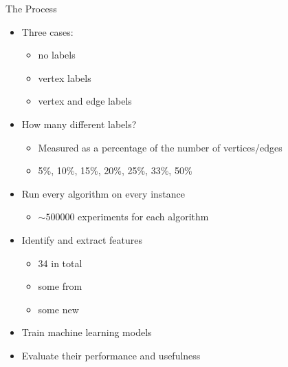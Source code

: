 \documentclass{beamer}
\begin{document}
\begin{frame}{The Process}
  \begin{itemize}
  \item Three cases:
    \begin{itemize}
    \item no labels
    \item vertex labels
    \item vertex and edge labels
    \end{itemize}
    \pause
  \item How many different labels?
    \begin{itemize}
    \item Measured as a percentage of the number of vertices/edges
    \item 5\%, 10\%, 15\%, 20\%, 25\%, 33\%, 50\%
    \end{itemize}
    \pause
  \item Run every algorithm on every instance
    \begin{itemize}
    \item $\sim\num{500000}$ experiments for each algorithm
    \end{itemize}
    \pause
  \item Identify and extract features
    \begin{itemize}
    \item 34 in total
    \item some from \cite{DBLP:conf/lion/KotthoffMS16}
    \item some new
    \end{itemize}
    \pause
  \item Train machine learning models
  \item Evaluate their performance and usefulness
  \end{itemize}
\end{frame}

\end{document}
